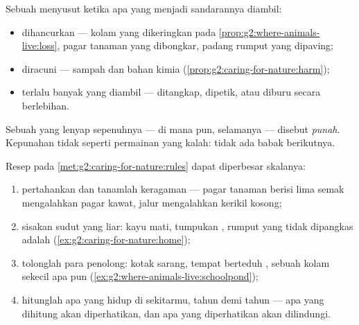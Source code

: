 \begin{proposition}\label{prop:g5:biodiversity:loss}
Sebuah  menyusut ketika apa yang menjadi sandarannya diambil:
\begin{itemize}
  \item \emph{} dihancurkan --- kolam yang dikeringkan pada
        \cref{prop:g2:where-animals-live:loss}, pagar tanaman yang
        dibongkar, padang rumput yang dipaving;
  \item {} diracuni --- sampah dan bahan kimia
        (\cref{prop:g2:caring-for-nature:harm});
  \item terlalu banyak yang diambil --- ditangkap, dipetik, atau
        diburu secara berlebihan.
\end{itemize}
Sebuah  yang lenyap sepenuhnya --- di mana pun, selamanya ---
disebut \emph{punah}. Kepunahan tidak seperti permainan
yang kalah: tidak ada babak berikutnya.
\end{proposition}
\admitted

\begin{method}\label{met:g5:biodiversity:help}
Resep pada \cref{met:g2:caring-for-nature:rules} dapat diperbesar
skalanya:
\begin{enumerate}
  \item pertahankan dan tanamlah keragaman --- pagar tanaman berisi
        lima semak mengalahkan pagar kawat, jalur  mengalahkan
        kerikil kosong;
  \item sisakan sudut yang liar: kayu mati, tumpukan , rumput yang
        tidak dipangkas adalah 
        (\cref{ex:g2:caring-for-nature:home});
  \item tolonglah para penolong: kotak sarang, tempat berteduh
        , sebuah kolam sekecil apa pun
        (\cref{ex:g2:where-animals-live:schoolpond});
  \item hitunglah apa yang hidup di sekitarmu, tahun demi tahun ---
        apa yang dihitung akan diperhatikan, dan apa yang diperhatikan
        akan dilindungi.
\end{enumerate}
\end{method}

